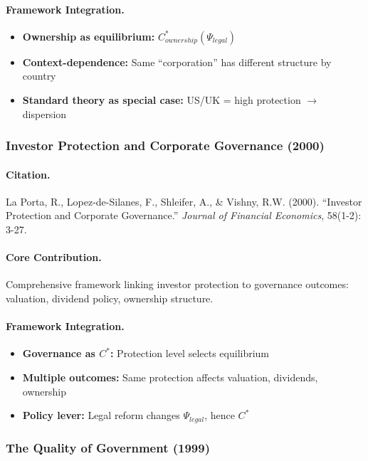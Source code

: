\paragraph{Framework Integration.}
\begin{itemize}
  \item \textbf{Ownership as equilibrium:} $C^*_{ownership}(\Psi_{legal})$
  \item \textbf{Context-dependence:} Same ``corporation'' has different structure by country
  \item \textbf{Standard theory as special case:} US/UK = high protection $\to$ dispersion
\end{itemize}

\subsubsection{Investor Protection and Corporate Governance (2000)}

\paragraph{Citation.}
La Porta, R., Lopez-de-Silanes, F., Shleifer, A., \& Vishny, R.W. (2000).
``Investor Protection and Corporate Governance.''
\emph{Journal of Financial Economics}, 58(1-2): 3-27.

\paragraph{Core Contribution.}
Comprehensive framework linking investor protection to governance outcomes:
valuation, dividend policy, ownership structure.

\paragraph{Framework Integration.}
\begin{itemize}
  \item \textbf{Governance as $C^*$:} Protection level selects equilibrium
  \item \textbf{Multiple outcomes:} Same protection affects valuation, dividends, ownership
  \item \textbf{Policy lever:} Legal reform changes $\Psi_{legal}$, hence $C^*$
\end{itemize}

\subsubsection{The Quality of Government (1999)}

